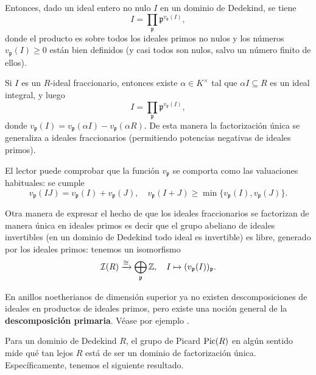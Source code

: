 Entonces, dado un ideal entero no nulo $I$ en un dominio de Dedekind, se tiene
$$I = \prod_{\mathfrak{p}} \mathfrak{p}^{v_{\mathfrak{p}} (I)},$$
donde el producto es sobre todos los ideales primos no nulos y los números
$v_{\mathfrak{p}} (I) \ge 0$ están bien definidos (y casi todos son nulos, salvo
un número finito de ellos).

Si $I$ es un $R$-ideal fraccionario, entonces existe $\alpha \in K^\times$
tal que $\alpha I \subseteq R$ es un ideal integral, y luego
$$I = \prod_{\mathfrak{p}} \mathfrak{p}^{v_{\mathfrak{p}} (I)},$$
donde $v_{\mathfrak{p}} (I) = v_{\mathfrak{p}} (\alpha I) - v_{\mathfrak{p}} (\alpha R)$.
De esta manera la factorización única se generaliza a ideales fraccionarios
(permitiendo potencias negativas de ideales primos).

El lector puede comprobar que la función $v_{\mathfrak{p}}$ se comporta como las
valuaciones habituales: se cumple
\[ v_{\mathfrak{p}} (IJ) = v_{\mathfrak{p}} (I) + v_{\mathfrak{p}} (J), \quad
   v_{\mathfrak{p}} (I+J) \ge \min \{ v_{\mathfrak{p}} (I), v_{\mathfrak{p}} (J) \}. \]

Otra manera de expresar el hecho de que los ideales fraccionarios se factorizan
de manera única en ideales primos es decir que el grupo abeliano de ideales
invertibles (en un dominio de Dedekind todo ideal es invertible) es libre,
generado por los ideales primos: tenemos un isomorfismo
\[ \mathcal{I} (R) \xrightarrow{\cong} \bigoplus_{\mathfrak{p}} \mathbb{Z}, \quad
   I \mapsto (v_{\mathfrak{p}} (I))_\mathfrak{p}. \]

\begin{comentario}
  En anillos noetherianos de dimensión superior ya no existen descomposiciones
  de ideales en productos de ideales primos, pero existe una noción general
  de la \textbf{descomposición primaria}. Véase por ejemplo
  \cite[Chapter 4, 6]{Atiyah-Macdonald}.
\end{comentario}

Para un dominio de Dedekind $R$, el grupo de Picard $\operatorname{Pic} (R)$ en algún sentido
mide qué tan lejos $R$ está de ser un dominio de factorización única.
Específicamente, tenemos el siguiente resultado.

